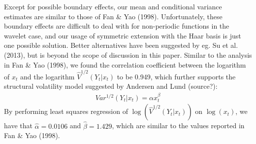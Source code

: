 \documentclass[12pt]{article}
\newcommand{\Ga}{\alpha}
\newcommand{\Gb}{\beta}
\begin{document}

Except for possible boundary effects, our mean and conditional variance estimates are similar to those of Fan \& Yao (1998). Unfortunately, these boundary effects are difficult to deal with for non-periodic functions in the wavelet case, and our usage of symmetric extension with the Haar basis is just one possible solution. Better alternatives have been suggested by eg. Su et al. (2013), but is beyond the scope of discussion in this paper. Similar to the analysis in Fan \& Yao (1998), we found the correlation coefficient between the logarithm of $x_t$ and the logarithm $\hat{V}^{1/2}(Y_t|x_t)$ to be 0.949, which further supports the structural volatility model suggested by Andersen and Lund (source?):
\begin{eqnarray}
Var^{1/2}(Y_t|x_t)=\Ga x_t^{\Gb}
\end{eqnarray}
By performing least squares regression of $\log(\hat{V}^{1/2}(Y_t|x_t))$ on $\log(x_t)$, we have that $\hat{\Ga}=0.0106$ and $\hat{\Gb}=1.429$, which are similar to the values reported in Fan \& Yao (1998).
\newpage
\end{document}

